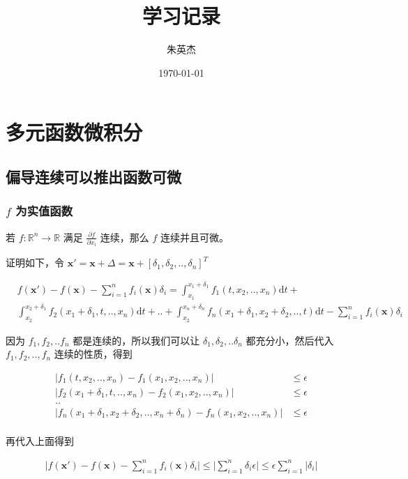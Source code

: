 \documentclass[12pt,a4paper]{ctexart}
\title{学习记录}
\author{朱英杰}
\date{\today}
\begin{document}
\maketitle
\tableofcontents

\section{多元函数微积分}

\subsection{偏导连续可以推出函数可微}

\subsubsection{$f$ 为实值函数}

若 $f: \mathbb{R}^n \to \mathbb{R}$ 满足 $\frac{\partial f}{\partial x_i}$ 连续，那么 $f$ 连续并且可微。

证明如下，令 $\mathbf{x'} = \mathbf{x} + \Delta = \mathbf{x} + [\delta_1, \delta_2, .., \delta_n]^T$

\begin{align*}
    & f(\mathbf{x}')  - f(\mathbf{x}) - \sum_{i=1}^{n}f_i(\mathbf{x})\delta_i = \int_{x_1}^{x_1 + \delta_1}f_1(t, x_2, .., x_n) \text{d}t  + \\ 
    & \int_{x_2}^{x_2 + \delta_1}f_2(x_1 + \delta_1, t, .., x_n) \text{d}t + .. + \int_{x_2}^{x_n + \delta_n}f_n(x_1 + \delta_1, x_2 + \delta_2, .., t) \text{d}t - \sum_{i=1}^{n}f_i(\mathbf{x}) \delta_i
\end{align*}

因为 $f_1, f_2, .. f_n$ 都是连续的，所以我们可以让 $\delta_1, \delta_2, .. \delta_n$ 都充分小，然后代入 $f_1, f_2, .., f_n$ 连续的性质，得到

\begin{align*}
\lvert f_1(t,x_2,..,x_n) - f_1(x_1, x_2, .. ,x_n)\rvert & \le \epsilon \\
\lvert f_2(x_1 + \delta_1,t,..,x_n) - f_2(x_1, x_2, .. ,x_n)\rvert & \le \epsilon \\
.. \\
\lvert f_n(x_1 + \delta_1,x_2+\delta_2,..,x_n+\delta_n) - f_n(x_1, x_2, .. ,x_n)\rvert & \le \epsilon \\
\end{align*}

再代入上面得到

\begin{align*}
    \lvert f(\mathbf{x}')  - f(\mathbf{x}) - \sum_{i=1}^{n}f_i(\mathbf{x})\delta_i \rvert \le \lvert \sum_{i=1}^{n} \delta_i \epsilon \rvert \le \epsilon \sum_{i=1}^{n} \lvert \delta_i \rvert
\end{align*}
\end{document}
